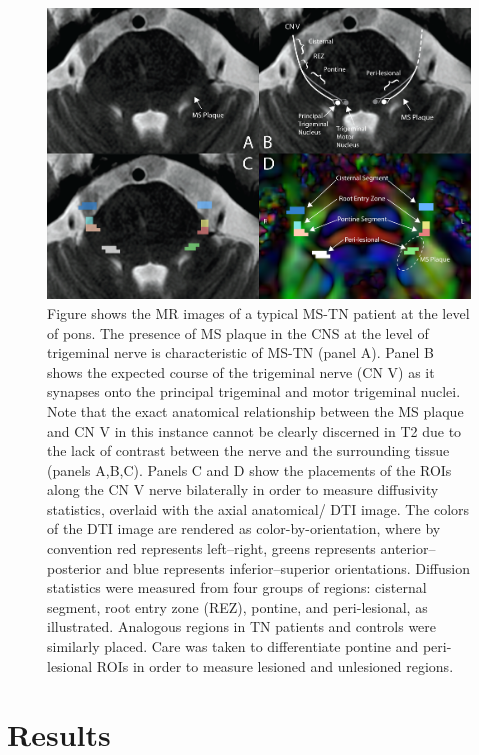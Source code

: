 \begin{figure}[p]
\includegraphics[width=\textwidth]{figure1.png}
\caption[Figure shows the MR images of a typical MS-TN patient at the level of pons.]{Figure shows the MR images of a typical MS-TN patient at the level of pons. The presence of MS plaque in the CNS at the level of trigeminal nerve is characteristic of MS-TN (panel A). Panel B shows the expected course of the trigeminal nerve (CN V) as it synapses onto the principal trigeminal and motor trigeminal nuclei. Note that the exact anatomical relationship between the MS plaque and CN V in this instance cannot be clearly discerned in T2 due to the lack of contrast between the nerve and the surrounding tissue (panels A,B,C). Panels C and D show the placements of the ROIs along the CN V nerve bilaterally in order to measure diffusivity statistics, overlaid with the axial anatomical/ DTI image. The colors of the DTI image are rendered as color-by-orientation, where by convention red represents left–right, greens represents anterior–posterior and blue represents inferior–superior orientations. Diffusion statistics were measured from four groups of regions: cisternal segment, root entry zone (REZ), pontine, and peri-lesional, as illustrated. Analogous regions in TN patients and controls were similarly placed. Care was taken to differentiate pontine and peri- lesional ROIs in order to measure lesioned and unlesioned regions.}
\centering
\label{fig:MSfigure1}
\end{figure}


\section{Results}
